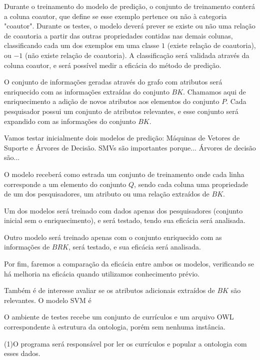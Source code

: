 Durante o treinamento do modelo de predição, o conjunto de treinamento conterá a coluna coautor, que define se esse exemplo pertence ou não à categoria "coautor". Durante os testes, o modelo deverá prever se existe ou não uma relação de coautoria a partir das outras propriedades contidas nas demais colunas, classificando cada um dos exemplos em uma classe $1$ (existe relação de coautoria), ou $-1$ (não existe relação de coautoria). A classificação será validada através da coluna coautor, e será possível medir a eficácia do método de predição.


O conjunto de informações geradas através do grafo com atributos será enriquecido com as informações extraídas do conjunto $BK$. Chamamos aqui de enriquecimento a adição de novos atributos aos elementos do conjunto $P$. Cada pesquisador possui um conjunto de atributos relevantes, e esse conjunto será expandido com as informações do conjunto $BK$.



Vamos testar inicialmente dois modelos de predição: Máquinas de Vetores de Suporte e Árvores de Decisão.
SMVs são importantes porque...
Árvores de decisão são...

O modelo receberá como estrada um conjunto de treinamento onde cada linha corresponde a um elemento do conjunto $Q$, sendo cada coluna uma propriedade de um dos pesquisadores, um atributo ou uma relação extraídos de $BK$.

Um dos modelos será treinado com dados apenas dos pesquisadores (conjunto inicial sem o enriquecimento), e será testado, tendo sua eficácia será analisada.

Outro modelo será treinado apenas com o conjunto enriquecido com as informações de $BRK$, será testado, e sua eficácia será analisada.

Por fim, faremos a comparação da eficácia entre ambos os modelos, verificando se há melhoria na eficácia quando utilizamos conhecimento prévio.

Também é de interesse avaliar se os atributos adicionais extraídos de $BK$ são relevantes. O modelo SVM é %


O ambiente de testes recebe um conjunto de currículos e um arquivo OWL correspondente à estrutura da ontologia, porém sem nenhuma instância.

(1)O programa será responsável por ler os currículos e popular a ontologia com esses dados.

